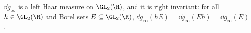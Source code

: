 $\dd g_\infty$ is a left Haar measure on $\GL_2(\R)$, and it is right invariant: for all $h\in\GL_2(\R)$ and Borel
sets $E\subseteq\GL_2(\R)$, $\dd g_\infty(hE)=\dd g_\infty(Eh)=\dd g_\infty(E)$.
